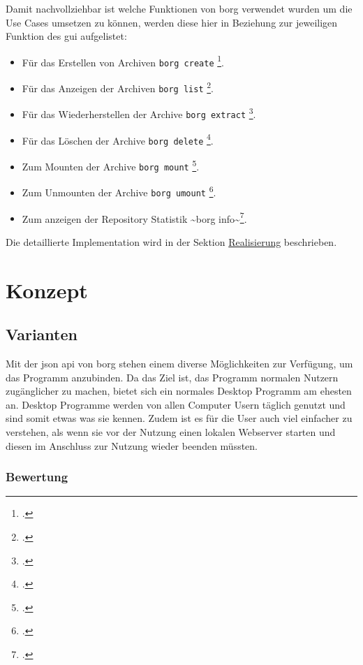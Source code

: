 Damit nachvollziehbar ist welche Funktionen von \gls{borg} verwendet wurden um
die Use Cases umsetzen zu können, werden diese hier in Beziehung zur
jeweiligen Funktion des \gls{gui} aufgelistet:
\begin{itemize}
\item Für das Erstellen von Archiven \texttt{borg create} \footcite{borgcreate}.
\item Für das Anzeigen der Archiven \texttt{borg list} \footcite{borginfo}.
\item Für das Wiederherstellen der Archive \texttt{borg extract} \footcite{borgextract}.
\item Für das Löschen der Archive \texttt{borg delete} \footcite{borgdelete}.
\item Zum Mounten der Archive \texttt{borg mount} \footcite{borgmount}.
\item Zum Unmounten der Archive \texttt{borg umount} \footcite{borgumount}.
\item Zum anzeigen der Repository Statistik \textasciitilde{}borg info\textasciitilde{}\footcite{borginfo}.
\end{itemize}

Die detaillierte Implementation wird in der Sektion \hyperref[sec:orgb833f22]{Realisierung} beschrieben.

\section{Konzept}
\label{sec:org3462c4c}

\subsection{Varianten}
\label{sec:org44227c4}

Mit der \gls{json} \gls{api} von \gls{borg} stehen einem diverse Möglichkeiten zur
Verfügung, um das Programm anzubinden. Da das Ziel ist, das Programm normalen
Nutzern zugänglicher zu machen, bietet sich ein normales Desktop Programm am
ehesten an. Desktop Programme werden von allen Computer Usern täglich genutzt
und sind somit etwas was sie kennen. Zudem ist es für die User auch viel
einfacher zu verstehen, als wenn sie vor der Nutzung einen lokalen Webserver
starten und diesen im Anschluss zur Nutzung wieder beenden müssten.

\subsubsection{Bewertung}
\label{sec:orgcdfcad2}

